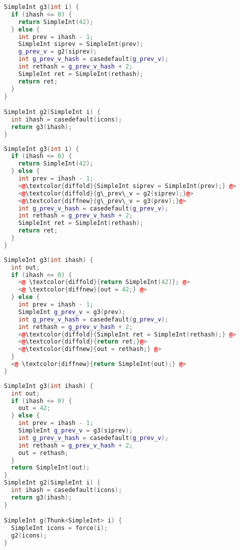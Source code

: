 \documentclass[sigplan,\review anonymous]{acmart}
\begin{document}
{\begin{lstlisting}[language=c++, caption=Step 3: outline block after \texttt{casedefault}]
SimpleInt g3(int i) {
  if (ihash <= 0) {
    return SimpleInt(42);
  } else {
    int prev = ihash - 1;
    SimpleInt siprev = SimpleInt(prev);
    g_prev_v = g2(siprev);
    int g_prev_v_hash = casedefault(g_prev_v);
    int rethash = g_prev_v_hash + 2;
    SimpleInt ret = SimpleInt(rethash);
    return ret;
  }
}

SimpleInt g2(SimpleInt i) {
  int ihash = casedefault(icons);
  return g3(ihash);
}
\end{lstlisting}

\begin{lstlisting}[language=c++, caption=Step 4: replace \texttt{g2} with \texttt{g3}]
SimpleInt g3(int i) {
  if (ihash <= 0) {
    return SimpleInt(42);
  } else {
    int prev = ihash - 1;
    <@\textcolor{diffold}{SimpleInt siprev = SimpleInt(prev);} @>
    <@\textcolor{diffold}{g\_prev\_v = g2(siprev);}@>
    <@\textcolor{diffnew}{g\_prev\_v = g3(prev);}@>
    int g_prev_v_hash = casedefault(g_prev_v);
    int rethash = g_prev_v_hash + 2;
    SimpleInt ret = SimpleInt(rethash);
    return ret;
  }
}
\end{lstlisting}

\begin{lstlisting}[language=c++, caption=Step 5: float out \texttt{SimpleInt}]
SimpleInt g3(int ihash) {
  int out;
  if (ihash <= 0) {
    <@ \textcolor{diffold}{return SimpleInt(42)}; @>
    <@ \textcolor{diffnew}{out = 42;} @>
  } else {
    int prev = ihash - 1;
    SimpleInt g_prev_v = g3(prev);
    int g_prev_v_hash = casedefault(g_prev_v);
    int rethash = g_prev_v_hash + 2;
    <@\textcolor{diffold}{SimpleInt ret = SimpleInt(rethash);} @>
    <@\textcolor{diffold}{return ret;}@>
    <@\textcolor{diffnew}{out = rethash;} @>
  }
  <@ \textcolor{diffnew}{return SimpleInt(out);} @>
}
\end{lstlisting}

\begin{lstlisting}[language=c++, caption=Step 5: taking stock]
SimpleInt g3(int ihash) {
  int out;
  if (ihash <= 0) {
    out = 42;
  } else {
    int prev = ihash - 1;
    SimpleInt g_prev_v = g3(siprev);
    int g_prev_v_hash = casedefault(g_prev_v);
    int rethash = g_prev_v_hash + 2;
    out = rethash;
  }
  return SimpleInt(out);
}
SimpleInt g2(SimpleInt i) {
  int ihash = casedefault(icons);
  return g3(ihash);
}

SimpleInt g(Thunk<SimpleInt> i) {
  SimpleInt icons = force(i);
  g2(icons);
}
\end{lstlisting}


}
\end{document}
